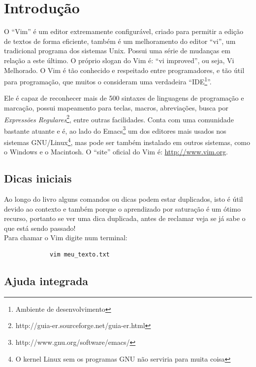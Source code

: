 \documentclass[10pt,a4paper,openany]{book}
\begin{document}
\newpage
\tableofcontents

\chapter{Introdução}

O ``Vim'' é um editor extremamente configurável, criado para permitir a edição
de textos de forma eficiente, também é um melhoramento do editor ``vi'', um
tradicional programa dos sistemas Unix. Possui uma série de mudanças em relação
a este último. O próprio slogan do Vim é: ``vi improved'', ou seja, Vi Melhorado.  O Vim é
tão conhecido e respeitado entre programadores, e tão útil para programação,
que muitos o consideram uma verdadeira ``IDE\footnote{Ambiente de
desenvolvimento}''.

Ele é capaz de reconhecer mais de 500 sintaxes de linguagens de programação e
marcação, possui mapeamento para teclas, macros, abreviações, busca por
{\em{Expressões Regulares}}\footnote{http://guia-er.sourceforge.net/guia-er.html},
entre outras facilidades. Conta com uma comunidade bastante atuante e é, ao
lado do Emacs\footnote{http://www.gnu.org/software/emacs/} um dos editores mais
usados nos sistemas GNU/Linux\footnote{O kernel Linux sem os programas GNU não serviria para muita coisa},
mas pode ser também instalado em outros sistemas,
como o Windows e o Macintosh.  O ``site'' oficial do Vim é:
\url{http://www.vim.org}.


\section{Dicas iniciais}\label{Dicas iniciais}

Ao longo do livro alguns comandos ou dicas podem estar duplicados, isto
é útil devido ao contexto e também porque o aprendizado por saturação
é um ótimo recurso, portanto se ver uma dica duplicada, antes de
reclamar veja se já sabe o que está sendo passado! \\

Para chamar o Vim digite num terminal:

\begin{verbatim}
			 vim meu_texto.txt
\end{verbatim}

\section{Ajuda integrada}
\end{document}
